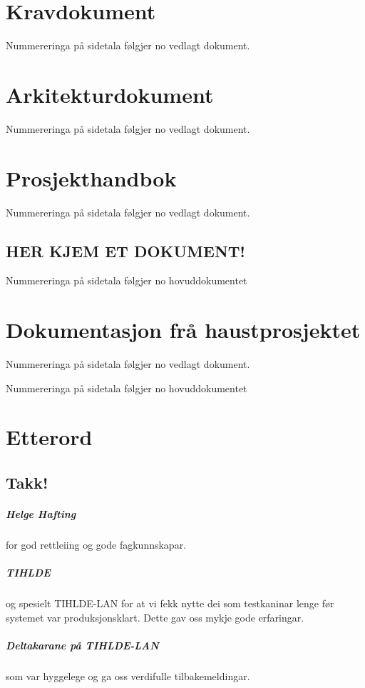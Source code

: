 \documentclass[nynorsk,12pt,a4paper,oneside]{book}
\begin{document}
\chapter{Kravdokument}
	Nummereringa på sidetala følgjer no vedlagt dokument.
	
\chapter{Arkitekturdokument}
	Nummereringa på sidetala følgjer no vedlagt dokument.
  	
\chapter{Prosjekthandbok}
	Nummereringa på sidetala følgjer no vedlagt dokument.
%	
	\section*{HER KJEM ET DOKUMENT!}
	Nummereringa på sidetala følgjer no hovuddokumentet
\chapter{Dokumentasjon frå haustprosjektet}
		Nummereringa på sidetala følgjer no vedlagt dokument.
	
	Nummereringa på sidetala følgjer no hovuddokumentet

\backmatter
\chapter{Etterord}
\section{Takk!}
\paragraph{Helge Hafting} for god rettleiing og gode fagkunnskapar.
\paragraph{TIHLDE} og spesielt TIHLDE-LAN for at vi fekk nytte dei som testkaninar lenge før systemet var produksjonsklart. Dette gav oss mykje gode erfaringar.
\paragraph{Deltakarane på TIHLDE-LAN} som var hyggelege og ga oss verdifulle tilbakemeldingar.
\end{document}
